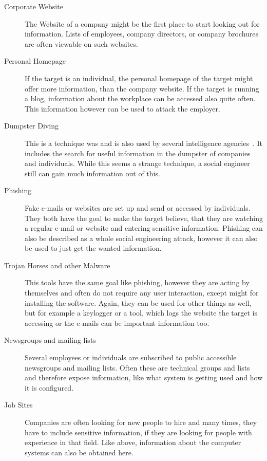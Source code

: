 \begin{description}

\item[Corporate Website] The Website of a company might be the first place to
  start looking out for information. Lists of employees,
  company directors, or company brochures are often viewable on such websites. 
\item[Personal Homepage] If the target is an individual, the personal homepage
  of the target might offer more information, than the company website. If the
  target is running a blog, information about the workplace can be accessed
  also quite often. This information however can be used to attack the
  employer.
\item[Dumpster Diving] This is a technique was and is also used by several
  intelligence agencies~\cite{lively2003}. It includes the search
  for useful information in the dumpster of companies and individuals. While
  this seems a strange technique, a social engineer still can gain much
  information out of this.
\item[Phishing] Fake e-mails or websites are set up and send or accessed by
  individuals. They both have the goal to make the target believe, that they are
  watching a regular e-mail or website and entering sensitive information.
  Phishing can also be described as a whole social engineering attack, however
  it can also be used to just get the wanted information.
\item[Trojan Horses and other Malware] This tools have the same goal like
  phishing, however they are acting by themselves and often do not require any
  user interaction, except might for installing the software. Again, they can
  be used for other things as well, but for example a keylogger or a tool,
  which logs the website the target is accessing or the e-mails can be
  important information too.
\item[Newsgroups and mailing lists] Several employees or individuals are
  subscribed to public accessible newsgroups and mailing lists. Often these are
  technical groups and lists and therefore expose information, like what system
  is getting used and how it is configured.
\item[Job Sites] Companies are often looking for new people to hire and many
  times, they have to include sensitive information, if they are looking for
  people with experience in that field. Like above, information about the
  computer systems can also be obtained here.
\end{description}

